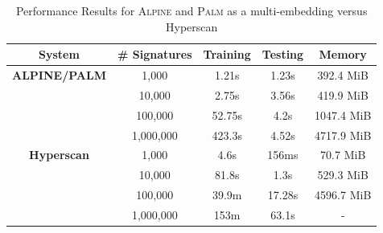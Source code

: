 \begin{table}[ht!]
\centering
\begin{tabular}{| c | c | c | c | c |}
\hline
System & \# Signatures & Training & Testing & Memory \\
\hline
\hline
\textbf{ALPINE/PALM} & 1,000 &  1.21s &  1.23s & 392.4 MiB \\
& 10,000 & 2.75s & 3.56s & 419.9 MiB \\
& 100,000 & 52.75s & 4.2s & 1047.4 MiB \\
& 1,000,000 & 423.3s & 4.52s & 4717.9 MiB \\
\hline
\textbf{Hyperscan} & 1,000 & 4.6s & 156ms & 70.7 MiB \\
& 10,000 & 81.8s & 1.3s & 529.3 MiB \\
& 100,000 & 39.9m & 17.28s & 4596.7 MiB \\
& 1,000,000 & 153m & 63.1s & - \\
\hline
\end{tabular}
\caption{Performance Results for \textsc{Alpine} and \textsc{Palm} as a multi-embedding versus Hyperscan}
\label{table:performanceresults}
\end{table}

